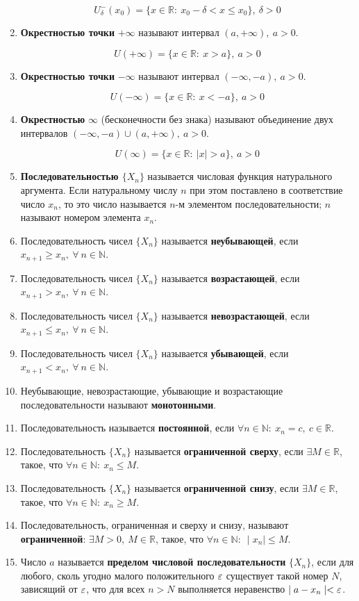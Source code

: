 \begin{enumerate}
$$U^-_{\delta}(x_0) = \{x \in \mathbb{R}: \ x_0 -\delta < x \leqslant x_0\},\ \delta > 0$$
\item \textbf{Окрестностью точки} $+\infty$ называют интервал $(a, +\infty), \ a > 0$.

$$U(+\infty) = \{x \in \mathbb{R}: \ x > a\}, \ a > 0$$
\item \textbf{Окрестностью точки} $-\infty$ называют интервал $(-\infty, -a), \ a > 0$.

$$U(-\infty) = \{x \in \mathbb{R}: \ x < -a\}, \ a > 0$$
\item \textbf{Окрестностью} $\infty$ (бесконечности без знака) называют объединение двух интервалов $(-\infty, −a) \cup (a, +\infty),\ a > 0$.

$$U(\infty) = \{x \in \mathbb{R}: \ | x | > a\}, \ a > 0$$
\item \textbf{Последовательностью $\{X_n\}$} называется числовая функция натурального аргумента. Если натуральному числу $n$ при этом поставлено в соответствие число $x_n$, то это число называется $n$-м элементом последовательности; $n$ называют номером элемента $x_n$.
\item Последовательность чисел $\{X_n\}$ называется \textbf{неубывающей}, если $x_{n+1}\geqslant x_n, \ \forall\ n \in \mathbb{N}$.
\item Последовательность чисел $\{X_n\}$ называется \textbf{возрастающей}, если $x_{n+1} > x_n, \ \forall\ n \in \mathbb{N}$.
\item Последовательность чисел $\{X_n\}$ называется \textbf{невозрастающей}, если $x_{n+1} \leqslant x_n, \ \forall\ n \in \mathbb{N}$.
\item Последовательность чисел $\{X_n\}$ называется \textbf{убывающей}, если $x_{n+1} < x_n, \ \forall\ n \in \mathbb{N}$.
\item Неубывающие, невозрастающие, убывающие и возрастающие последовательности называют \textbf{монотонными}.
\item Последовательность называется \textbf{постоянной}, если $ \forall n \in \mathbb{N}: \ x_n = c, \ c \in \mathbb{R}$.
\item Последовательность $\{X_n\}$ называется \textbf{ограниченной сверху}, если $\exists M \in \mathbb{R}$, такое, что $\forall n \in \mathbb{N}: \ x_n \leqslant M$.
\item Последовательность $\{X_n\}$ называется \textbf{ограниченной снизу}, если $\exists M \in \mathbb{R}$, такое, что $\forall n \in \mathbb{N}: \ x_n \geqslant M$.
\item Последовательность, ограниченная и сверху и снизу, называют \textbf{ограниченной}: $\exists M > 0, \ M \in \mathbb{R}$, такое, что $\forall n \in \mathbb{N}: \ \mid  x_n\mid   \leqslant M$.
\item Число $a$ называется \textbf{пределом числовой последовательности} $\{X_n\}$, если для любого, сколь угодно малого положительного ${\large\varepsilon}$ существует такой номер $N$, зависящий от ${\large\varepsilon}$, что для всех $n > N$ выполняется неравенство $\mid  a - x_n\mid   < {\large\varepsilon}$.


\end{enumerate}
